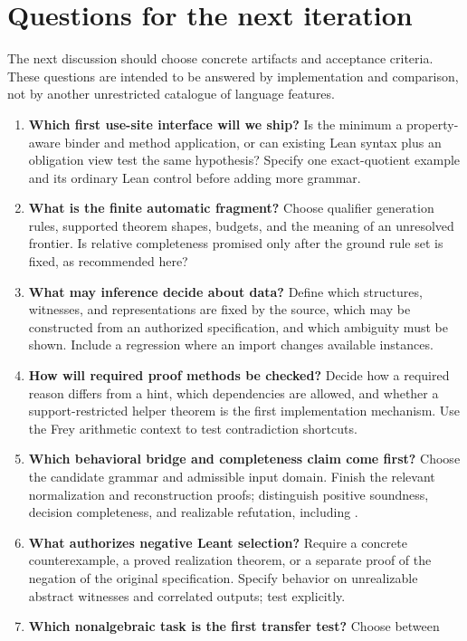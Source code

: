\documentclass[11pt,letterpaper]{article}
\newcommand{\code}[1]{\texttt{\detokenize{#1}}}
\theoremstyle{definition}\newtheorem{definition}[proposition]{Definition}
\theoremstyle{remark}\newtheorem{remark}[proposition]{Remark}
\begin{document}
\section{Questions for the next iteration}\label{sec:questions}
The next discussion should choose concrete artifacts and acceptance criteria.
These questions are intended to be answered by implementation and comparison,
not by another unrestricted catalogue of language features.
\begin{enumerate}
\item \textbf{Which first use-site interface will we ship?} Is the minimum a
property-aware binder and method application, or can existing Lean syntax plus
an obligation view test the same hypothesis? Specify one exact-quotient example
and its ordinary Lean control before adding more grammar.
\item \textbf{What is the finite automatic fragment?} Choose qualifier
generation rules, supported theorem shapes, budgets, and the meaning of an
unresolved frontier. Is relative completeness promised only after the ground
rule set is fixed, as recommended here?
\item \textbf{What may inference decide about data?} Define which structures,
witnesses, and representations are fixed by the source, which may be constructed
from an authorized specification, and which ambiguity must be shown. Include
a regression where an import changes available instances.
\item \textbf{How will required proof methods be checked?} Decide how a required
reason differs from a hint, which dependencies are allowed, and whether a
support-restricted helper theorem is the first implementation mechanism.
Use the Frey arithmetic context to test contradiction shortcuts.
\item \textbf{Which behavioral bridge and completeness claim come first?}
Choose the candidate grammar and admissible input domain. Finish the relevant
normalization and reconstruction proofs; distinguish positive soundness,
decision completeness, and realizable refutation, including \code{List Empty}.
\item \textbf{What authorizes negative Leant selection?} Require a concrete
counterexample, a proved realization theorem, or a separate proof of the
negation of the original specification. Specify behavior on unrealizable
abstract witnesses and correlated outputs; test \code{List Empty} explicitly.
\item \textbf{Which nonalgebraic task is the first transfer test?} Choose between

\end{enumerate}
\end{document}
